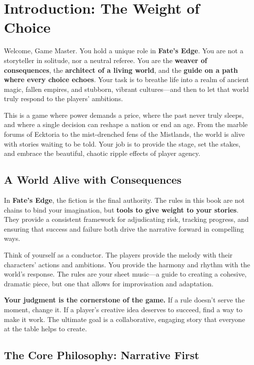 \chapter{Introduction: The Weight of Choice}

Welcome, Game Master. You hold a unique role in \textbf{Fate's Edge}. You are not a storyteller in solitude, nor a neutral referee. You are the \textbf{weaver of consequences}, the \textbf{architect of a living world}, and the \textbf{guide on a path where every choice echoes}. Your task is to breathe life into a realm of ancient magic, fallen empires, and stubborn, vibrant cultures—and then to let that world truly respond to the players' ambitions.

This is a game where power demands a price, where the past never truly sleeps, and where a single decision can reshape a nation or end an age. From the marble forums of Ecktoria to the mist-drenched fens of the Mistlands, the world is alive with stories waiting to be told. Your job is to provide the stage, set the stakes, and embrace the beautiful, chaotic ripple effects of player agency.

\section*{A World Alive with Consequences}

In \textbf{Fate's Edge}, the fiction is the final authority. The rules in this book are not chains to bind your imagination, but \textbf{tools to give weight to your stories}. They provide a consistent framework for adjudicating risk, tracking progress, and ensuring that success and failure both drive the narrative forward in compelling ways.

Think of yourself as a conductor. The players provide the melody with their characters' actions and ambitions. You provide the harmony and rhythm with the world's response. The rules are your sheet music—a guide to creating a cohesive, dramatic piece, but one that allows for improvisation and adaptation.

\textbf{Your judgment is the cornerstone of the game.} If a rule doesn't serve the moment, change it. If a player's creative idea deserves to succeed, find a way to make it work. The ultimate goal is a collaborative, engaging story that everyone at the table helps to create.

\section*{The Core Philosophy: Narrative First}

